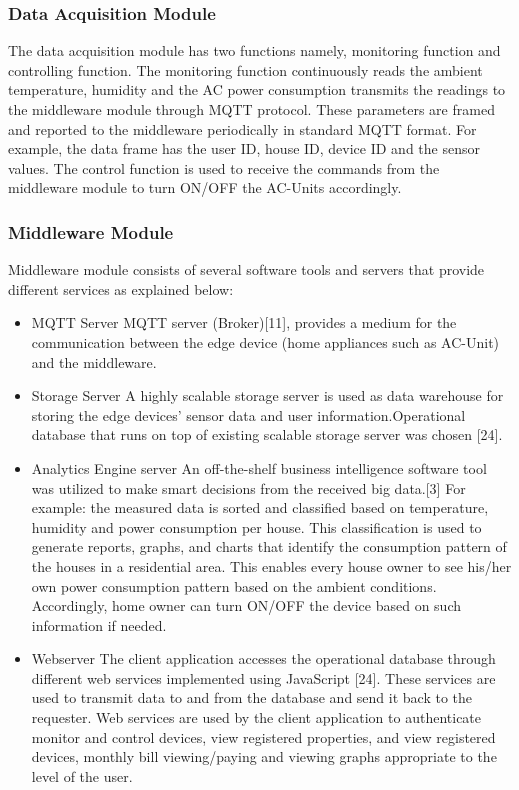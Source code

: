 \documentclass[a4paper,12pt,oneside]{article}
\begin{document}
\subsubsection{Data Acquisition Module}
The data acquisition module has two functions namely,
monitoring function and controlling function. The monitoring
function continuously reads the ambient temperature, humidity
and the AC power consumption transmits the readings to the
middleware module through MQTT protocol. These
parameters are framed and reported to the middleware
periodically in standard MQTT format. For example, the data
frame has the user ID, house ID, device ID and the sensor values. The control function is used to receive the commands
from the middleware module to turn ON/OFF the AC-Units
accordingly.
\subsubsection{Middleware Module}
Middleware module consists of several software tools and
servers that provide different services as explained below:
\begin{itemize}
    \item MQTT Server
    \newline
    MQTT server (Broker)[11], provides a medium for the
    communication between the edge device (home
    appliances such as AC-Unit) and the middleware.
    \item Storage Server\newline
    A highly scalable storage server is used as data
    warehouse for storing the edge devices’ sensor data and
    user information.Operational database that runs on
    top of existing scalable storage server was chosen [24].
    \item Analytics Engine server \newline
    An off-the-shelf business intelligence software tool was
    utilized to make smart decisions from the received big
    data.[3] \newline For example: the measured data is sorted and
    classified based on temperature, humidity and power
    consumption per house. This classification is used to
    generate reports, graphs, and charts that identify the
    consumption pattern of the houses in a residential area.
    This enables every house owner to see his/her own power
    consumption pattern based on the ambient conditions.
    Accordingly, home owner can turn ON/OFF the device
    based on such information if needed.
    \item Webserver \newline
      The client application accesses the operational database
    through different web services implemented using
    JavaScript [24]. These services are used to transmit data
    to and from the database and send it back to the
    requester. Web services are used by the client application
    to authenticate monitor and control devices, view
    registered properties, and view registered devices,
    monthly bill viewing/paying and viewing graphs
    appropriate to the level of the user.
    
\end{itemize}
\end{document}
